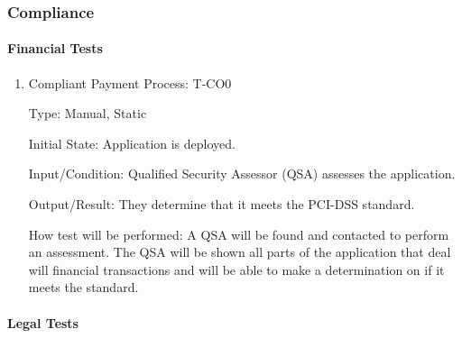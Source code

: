 \documentclass[12pt, titlepage]{article}
\begin{document}
\subsubsection{Compliance}

\paragraph{Financial Tests}

\begin{enumerate}

\item{Compliant Payment Process: T-CO0\\}

Type: Manual, Static
					
Initial State: Application is deployed.
					
Input/Condition: Qualified Security Assessor (QSA) assesses the application.
					
Output/Result: They determine that it meets the PCI-DSS standard.
					
How test will be performed: A QSA will be found and contacted to perform an assessment. The QSA will be shown all parts of the application that deal will financial transactions and will be able to make a determination on if it meets the standard.
\end{enumerate}
		
\paragraph{Legal Tests}
\end{document}
